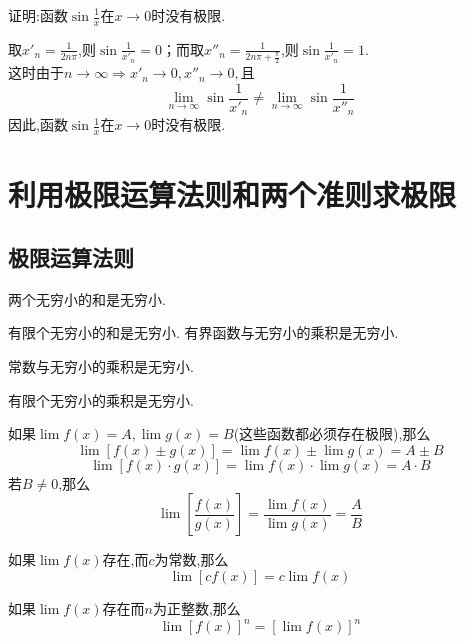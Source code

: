 \example[证明函数的极限不存在]
\sj \examples 证明:函数$\displaystyle \sin \frac{1}{x}$在$x\to 0$时没有极限.

\proof 取$\displaystyle x'_n=\frac{1}{2n\pi }$,则$\displaystyle \sin \frac{1}{x'_n}=0$；而取$\displaystyle x''_n=\frac{1}{2n\pi+\frac{\pi}{2} }$,则$\displaystyle \sin \frac{1}{x'_n}=1.$\\[0.5em]
这时由于$n \to \infty \Rightarrow x'_n\to 0,x''_n \to 0, $且
\begin{equation*}
	\lim\limits_{n \to \infty} \sin \frac{1}{x'_n} \ne \lim\limits_{n \to \infty} \sin \frac{1}{x''_n} 
\end{equation*}
因此,函数$\displaystyle \sin \frac{1}{x}$在$x\to 0$时没有极限.

\section{利用极限运算法则和两个准则求极限}
\subsection{极限运算法则}
\ttheorem[极限运算法则1]
两个无穷小的和是无穷小.

\tl 有限个无穷小的和是无穷小.
\newpage
\theorem[极限运算法则2]
有界函数与无穷小的乘积是无穷小.

\tl 常数与无穷小的乘积是无穷小.

\tl 有限个无穷小的乘积是无穷小.\jg

\theorem[极限运算法则3]
如果$\lim f(x) = A, \lim g(x) = B$(这些函数都必须存在极限),那么
\begin{equation}
	\lim [f(x)\pm g(x)]=\lim f(x)\pm \lim g(x)=A \pm B
\end{equation}
\begin{equation}
	\lim[f(x)\cdot g(x)]=\lim f(x)\cdot \lim g(x)=A\cdot B
\end{equation}
若$B\ne 0$,那么
\begin{equation}
	\lim \left[ \frac{f(x)}{g(x)}\right] =\frac{\lim f(x)}{\lim g(x)}=\frac{A}{B}
\end{equation}

\tl 如果$\lim f(x)$存在,而$c$为常数,那么
\begin{equation}
	\lim [cf(x)]=c \lim f(x)
\end{equation}

\tl 如果$\lim f(x)$存在而$n$为正整数,那么
\begin{equation}
	\lim [f(x)]^n=[\lim f(x)]^n
\end{equation}

